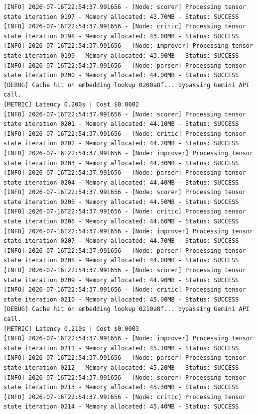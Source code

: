 \documentclass[10pt,journal,compsoc]{IEEEtran}
\begin{document}
\begin{verbatim}
[INFO] 2026-07-16T22:54:37.991656 - [Node: scorer] Processing tensor state iteration 0197 - Memory allocated: 43.70MB - Status: SUCCESS
[INFO] 2026-07-16T22:54:37.991656 - [Node: critic] Processing tensor state iteration 0198 - Memory allocated: 43.80MB - Status: SUCCESS
[INFO] 2026-07-16T22:54:37.991656 - [Node: improver] Processing tensor state iteration 0199 - Memory allocated: 43.90MB - Status: SUCCESS
[INFO] 2026-07-16T22:54:37.991656 - [Node: parser] Processing tensor state iteration 0200 - Memory allocated: 44.00MB - Status: SUCCESS
[DEBUG] Cache hit on embedding lookup 0200a8f... bypassing Gemini API call.
[METRIC] Latency 0.200s | Cost $0.0002
[INFO] 2026-07-16T22:54:37.991656 - [Node: scorer] Processing tensor state iteration 0201 - Memory allocated: 44.10MB - Status: SUCCESS
[INFO] 2026-07-16T22:54:37.991656 - [Node: critic] Processing tensor state iteration 0202 - Memory allocated: 44.20MB - Status: SUCCESS
[INFO] 2026-07-16T22:54:37.991656 - [Node: improver] Processing tensor state iteration 0203 - Memory allocated: 44.30MB - Status: SUCCESS
[INFO] 2026-07-16T22:54:37.991656 - [Node: parser] Processing tensor state iteration 0204 - Memory allocated: 44.40MB - Status: SUCCESS
[INFO] 2026-07-16T22:54:37.991656 - [Node: scorer] Processing tensor state iteration 0205 - Memory allocated: 44.50MB - Status: SUCCESS
[INFO] 2026-07-16T22:54:37.991656 - [Node: critic] Processing tensor state iteration 0206 - Memory allocated: 44.60MB - Status: SUCCESS
[INFO] 2026-07-16T22:54:37.991656 - [Node: improver] Processing tensor state iteration 0207 - Memory allocated: 44.70MB - Status: SUCCESS
[INFO] 2026-07-16T22:54:37.991656 - [Node: parser] Processing tensor state iteration 0208 - Memory allocated: 44.80MB - Status: SUCCESS
[INFO] 2026-07-16T22:54:37.991656 - [Node: scorer] Processing tensor state iteration 0209 - Memory allocated: 44.90MB - Status: SUCCESS
[INFO] 2026-07-16T22:54:37.991656 - [Node: critic] Processing tensor state iteration 0210 - Memory allocated: 45.00MB - Status: SUCCESS
[DEBUG] Cache hit on embedding lookup 0210a8f... bypassing Gemini API call.
[METRIC] Latency 0.210s | Cost $0.0003
[INFO] 2026-07-16T22:54:37.991656 - [Node: improver] Processing tensor state iteration 0211 - Memory allocated: 45.10MB - Status: SUCCESS
[INFO] 2026-07-16T22:54:37.991656 - [Node: parser] Processing tensor state iteration 0212 - Memory allocated: 45.20MB - Status: SUCCESS
[INFO] 2026-07-16T22:54:37.991656 - [Node: scorer] Processing tensor state iteration 0213 - Memory allocated: 45.30MB - Status: SUCCESS
[INFO] 2026-07-16T22:54:37.991656 - [Node: critic] Processing tensor state iteration 0214 - Memory allocated: 45.40MB - Status: SUCCESS

\end{verbatim}
\end{document}
